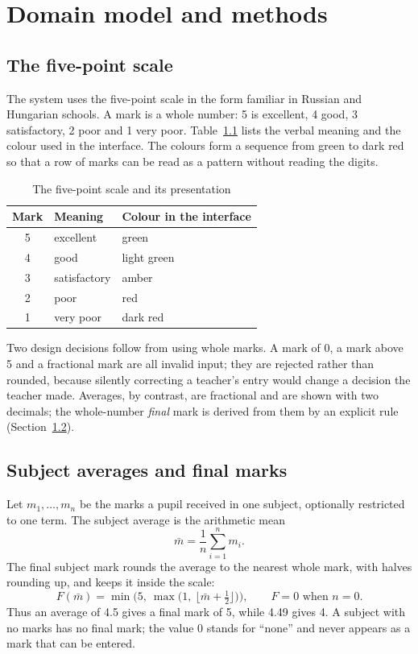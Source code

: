 \chapter{Domain model and methods}

\section{The five-point scale}

The system uses the five-point scale in the form familiar in Russian and Hungarian schools. A mark is a whole number: 5 is excellent, 4 good, 3 satisfactory, 2 poor and 1 very poor. Table~\ref{tab:scale} lists the verbal meaning and the colour used in the interface. The colours form a sequence from green to dark red so that a row of marks can be read as a pattern without reading the digits.

\begin{table}[H]
\centering
\caption{The five-point scale and its presentation}
\label{tab:scale}
\begin{tabular}{@{}cll@{}}
\toprule
Mark & Meaning & Colour in the interface \\
\midrule
5 & excellent & green \\
4 & good & light green \\
3 & satisfactory & amber \\
2 & poor & red \\
1 & very poor & dark red \\
\bottomrule
\end{tabular}
\end{table}

Two design decisions follow from using whole marks. A mark of 0, a mark above 5 and a fractional mark are all invalid input; they are rejected rather than rounded, because silently correcting a teacher's entry would change a decision the teacher made. Averages, by contrast, are fractional and are shown with two decimals; the whole-number \emph{final} mark is derived from them by an explicit rule (Section~\ref{sec:final}).

\section{Subject averages and final marks}
\label{sec:final}

Let $m_1,\dots,m_n$ be the marks a pupil received in one subject, optionally restricted to one term. The subject average is the arithmetic mean
\begin{equation}
\bar m = \frac{1}{n}\sum_{i=1}^{n} m_i .
\end{equation}
The final subject mark rounds the average to the nearest whole mark, with halves rounding up, and keeps it inside the scale:
\begin{equation}
F(\bar m) = \min\bigl(5,\ \max\bigl(1,\ \lfloor \bar m + \tfrac12 \rfloor\bigr)\bigr),
\qquad F = 0 \text{ when } n = 0 .
\end{equation}
Thus an average of 4.5 gives a final mark of 5, while 4.49 gives 4. A subject with no marks has no final mark; the value 0 stands for ``none'' and never appears as a mark that can be entered.

